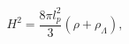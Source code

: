 \begin{equation}
H^{2}=\frac{8\pi l_{p}^{2}}{3}\left( \rho +\rho _{\Lambda }\right) ,
\end{equation}

